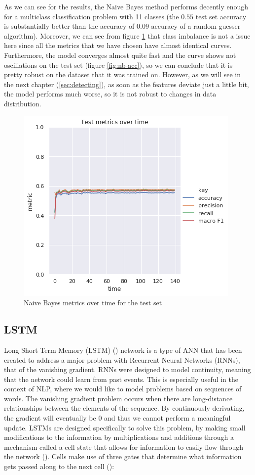 \documentclass[12pt]{extreport}
\begin{document}
As we can see for the results, the Naive Bayes method performs decently enough for a multiclass classification problem with 11 classes (the $0.55$ test set accuracy is substantially better than the accuracy of $0.09$ accuracy of a random guesser algorithm). Moreover, we can see from figure \ref{fig:nb-metrics} that class imbalance is not a issue here since all the metrics that we have chosen have almost identical curves. Furthermore, the model converges almost quite fast and the curve shows not oscillations on the test set (figure \ref{fig:nb-acc}), so we can conclude that it is pretty robust on the dataset that it was trained on. However, as we will see in the next chapter (\ref{sec:detecting}), as soon as the features deviate just a little bit, the model performs much worse, so it is not robust to changes in data distribution.

\begin{figure}[H]
\centering
\includegraphics[width=0.8\linewidth]{assets/framework/nb_BERT_test_metrics_holdout.png}
\caption{Naive Bayes metrics over time for the test set}
\label{fig:nb-metrics}
\end{figure}

\subsection{LSTM} \label{sec:lstm}

Long Short Term Memory (LSTM) (\cite{lstm}) network is a type of ANN that has been created to address a major problem with Recurrent Neural Networks (RNNs), that of the vanishing gradient. RNNs were designed to model continuity, meaning that the network could learn from past events. This is especially useful in the context of NLP, where we would like to model problems based on sequences of words. The vanishing gradient problem occurs when there are long-distance relationships between the elements of the sequence. By continuously derivating, the gradient will eventually be 0 and thus we cannot perform a meaningful update. LSTMs are designed specifically to solve this problem, by making small modifications to the information by multiplications and additions through a mechanism called a cell state that allows for information to easily flow through the network (\cite{lstmrnnfundamentals}). Cells make use of three gates that determine what information gets passed along to the next cell (\cite{colahlstm}):
\end{document}
